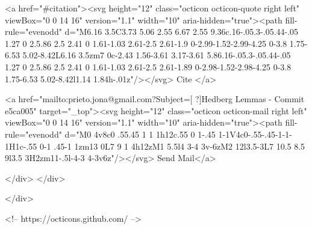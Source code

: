       <a  href="#citation"><svg height="12" class="octicon octicon-quote right left" viewBox="0 0 14 16" version="1.1" width="10" aria-hidden="true"><path fill-rule="evenodd" d="M6.16 3.5C3.73 5.06 2.55 6.67 2.55 9.36c.16-.05.3-.05.44-.05 1.27 0 2.5.86 2.5 2.41 0 1.61-1.03 2.61-2.5 2.61-1.9 0-2.99-1.52-2.99-4.25 0-3.8 1.75-6.53 5.02-8.42L6.16 3.5zm7 0c-2.43 1.56-3.61 3.17-3.61 5.86.16-.05.3-.05.44-.05 1.27 0 2.5.86 2.5 2.41 0 1.61-1.03 2.61-2.5 2.61-1.89 0-2.98-1.52-2.98-4.25 0-3.8 1.75-6.53 5.02-8.42l1.14 1.84h-.01z"/></svg> Cite
      </a>

      <a href="mailto:prieto.jona@gmail.com?Subject=[ ?]Hedberg Lemmas - Commit e5ca005" target="_top"><svg height="12" class="octicon octicon-mail right left" viewBox="0 0 14 16" version="1.1" width="10" aria-hidden="true"><path fill-rule="evenodd" d="M0 4v8c0 .55.45 1 1 1h12c.55 0 1-.45 1-1V4c0-.55-.45-1-1-1H1c-.55 0-1 .45-1 1zm13 0L7 9 1 4h12zM1 5.5l4 3-4 3v-6zM2 12l3.5-3L7 10.5 8.5 9l3.5 3H2zm11-.5l-4-3 4-3v6z"/></svg> Send Mail</a>

    </div>
  </div>

</div>

<!-- https://octicons.github.com/ -->





